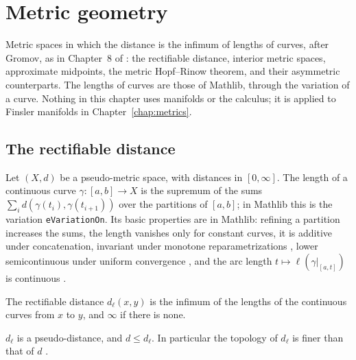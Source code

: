 \chapter{Metric geometry}
\label{chap:metric-spaces}

Metric spaces in which the distance is the infimum of lengths of curves, after Gromov, as in
Chapter~8 of \cite{Lar26}: the rectifiable distance, interior metric spaces, approximate midpoints,
the metric Hopf--Rinow theorem, and their asymmetric counterparts. The lengths of curves are
those of Mathlib, through the variation of a curve. Nothing in this chapter uses manifolds or the
calculus; it is applied to Finsler manifolds in Chapter~\ref{chap:metrics}.

\section{The rectifiable distance}
\label{sec:ms-rectifiable}

Let $(X, d)$ be a pseudo-metric space, with distances in $[0, \infty]$. The length of a continuous
curve $\gamma \colon [a, b] \to X$ is the supremum of the sums
$\sum_i d(\gamma(t_i), \gamma(t_{i+1}))$ over the partitions of $[a, b]$; in Mathlib this is the
variation \texttt{eVariationOn}. Its basic properties are in Mathlib: refining a partition
increases the sums, the length vanishes only for constant curves, it is additive under
concatenation, invariant under monotone reparametrizations \cite[Obs.~8.1.1]{Lar26}, lower
semicontinuous under uniform convergence \cite[Prop.~8.1.3]{Lar26}, and the arc length
$t \mapsto \ell(\gamma|_{[a, t]})$ is continuous \cite[Lema~8.1.4]{Lar26}.

\begin{definition}
  \label{def:ms-length-dist}
  \leanok
  The rectifiable distance $d_\ell(x, y)$ is the infimum of the lengths of the continuous curves
  from $x$ to $y$, and $\infty$ if there is none.
\end{definition}

\begin{proposition}
  \label{prop:ms-length-dist}
  \leanok
  $d_\ell$ is a pseudo-distance, and $d \leq d_\ell$. In particular the topology of $d_\ell$ is
  finer than that of $d$ \cite[Obs.~8.1.7]{Lar26}.
\end{proposition}

